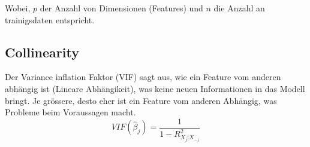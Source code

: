 Wobei, $p$ der Anzahl von Dimensionen (Features) und $n$ die Anzahl an trainigsdaten entspricht.

\subsection{Collinearity}
Der Variance inflation Faktor (VIF) sagt aus, wie ein Feature vom anderen abhängig ist (Lineare Abhängikeit), was keine neuen Informationen in das Modell bringt. Je grössere, desto eher ist ein Feature vom anderen Abhängig, was Probleme beim Voraussagen macht.
\[
VIF(\hat{\beta}_j) = \frac{1}{1 - R^2_{X_j|X_{-j}}}
\]